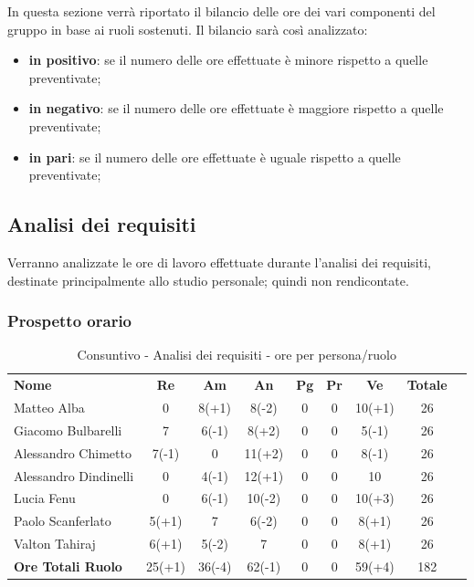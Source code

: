 
In questa sezione verrà riportato il bilancio delle ore dei vari componenti del gruppo in base ai ruoli sostenuti. Il bilancio sarà così analizzato:
\begin{itemize}
	\item {\bfseries in positivo}: se il numero delle ore effettuate è minore rispetto a quelle preventivate;
	\item {\bfseries in negativo}: se il numero delle ore effettuate è maggiore rispetto a quelle preventivate;
	\item {\bfseries in pari}: se il numero delle ore effettuate è uguale rispetto a quelle preventivate; \\
\end{itemize}

\subsection {Analisi dei requisiti}
Verranno analizzate le ore di lavoro effettuate durante l'analisi dei requisiti, destinate principalmente allo studio personale; quindi non rendicontate.
\subsubsection{Prospetto orario}
	\begin{table} [h!]
	\begin{center}
		\begin{tabular} { m{6 cm} c c c c c c c c }
			\rowcolor{lightgray}
			\textbf{Nome} & \textbf{Re} & \textbf{Am} & \textbf{An} & \textbf{Pg} &\textbf{Pr} & \textbf{Ve} & \textbf{Totale} \\ 
			Matteo Alba & 0 & 8(+1) &8(-2) & 0 & 0 & 10(+1) & 26  \\ 
			Giacomo Bulbarelli & 7 & 6(-1) & 8(+2) & 0 & 0 & 5(-1) & 26 \\ 
			Alessandro Chimetto & 7(-1) & 0 & 11(+2) & 0 & 0 & 8(-1) & 26 \\
			Alessandro Dindinelli & 0 & 4(-1) & 12(+1) & 0 & 0 & 10 & 26 \\
			Lucia Fenu & 0 & 6(-1) & 10(-2) & 0 & 0 & 10(+3) & 26 \\
			Paolo Scanferlato & 5(+1) & 7 & 6(-2) & 0 & 0 & 8(+1) & 26 \\
			Valton Tahiraj & 6(+1) & 5(-2) &7 & 0 & 0 & 8(+1) & 26 \\
			\textbf{Ore Totali Ruolo} & 25(+1) & 36(-4) & 62(-1) & 0 & 0 & 59(+4) & 182\\
		
		\end{tabular}
		\caption{Consuntivo - Analisi dei requisiti - ore per persona/ruolo}
	\end{center}
\end{table}

